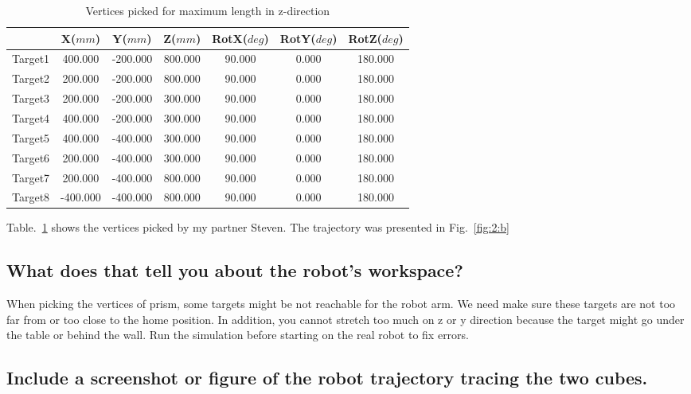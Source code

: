 \documentclass[letterpaper,11pt]{texMemo} %
\begin{document}
\renewcommand\arraystretch{2}
\begin{table}[H]\footnotesize
	\centering
	\begin{tabular}{|c|c|c|c|c|c|c|}
		\hline
		& \textbf{X($mm$)}&\textbf{Y($mm$)}&\textbf{Z($mm$)}& \textbf{RotX($deg$)} & \textbf{RotY($deg$)} & \textbf{RotZ($deg$)} \\
		\hline
		Target1 & 400.000 & -200.000 & 800.000 & 90.000 & 0.000 & 180.000\\
		\hline
		Target2 & 200.000 & -200.000 & 800.000 & 90.000 & 0.000 & 180.000\\
		\hline
		Target3 & 200.000 & -200.000 & 300.000 & 90.000 & 0.000 & 180.000\\
		\hline 
		Target4 & 400.000 & -200.000 & 300.000 & 90.000 & 0.000 & 180.000\\
		\hline
		Target5  & 400.000 & -400.000 & 300.000 & 90.000 & 0.000 & 180.000\\
		\hline
		Target6  & 200.000 & -400.000 & 300.000 & 90.000 & 0.000 & 180.000\\
		\hline
		Target7  & 200.000 & -400.000 & 800.000 & 90.000 & 0.000 & 180.000\\
		\hline
		Target8  &-400.000 & -400.000 & 800.000 & 90.000 & 0.000 & 180.000\\
		\hline
	\end{tabular}
	\caption{Vertices picked for maximum length in z-direction}
	\label{table:2}
\end{table}


Table.~\ref{table:2} shows the vertices picked by my partner Steven. The trajectory was presented in Fig.~\ref{fig:2:b}



\subsection{What does that tell you about the robot’s workspace?}

When picking the vertices of prism, some targets might be not reachable for the robot arm. We need make sure these targets are not too far from or too close to the home position. In addition, you cannot stretch too much on z or
y direction because the target might go under the table or behind the wall. Run the simulation before starting on the real robot to fix errors. 


\subsection{Include a screenshot or figure of the robot trajectory tracing the two cubes.}
\end{document}
